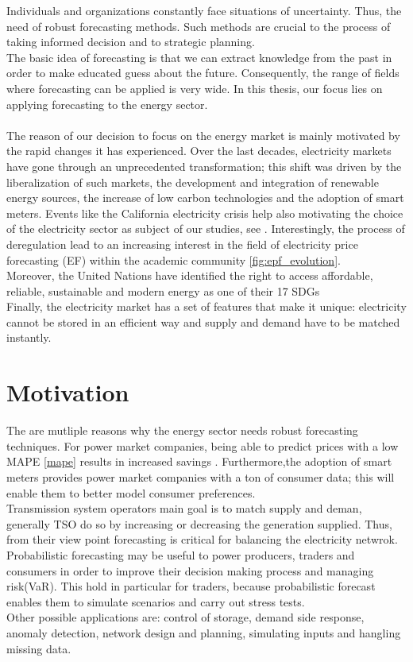 Individuals and organizations constantly face situations of uncertainty. Thus, the need of robust forecasting methods. Such methods are crucial to the process of taking informed decision and to strategic planning.
\\
The basic idea of forecasting is that we can extract knowledge from the past in order to make educated guess about the future. Consequently, the range of fields where forecasting can be applied is very wide.
In this thesis, our focus lies on applying forecasting to the energy sector. 
\\
\\
The reason of our decision to focus on the energy market is mainly motivated by the rapid changes it has experienced.
Over the last decades, electricity markets have gone through an unprecedented transformation; this shift was driven by the liberalization of such markets, the development and integration of renewable energy sources, the  increase of low carbon technologies and the adoption of smart meters. Events like the California electricity crisis help also motivating the choice of the electricity sector as subject of our studies, see \cite{california}.
Interestingly, the process of deregulation lead to an increasing interest in the field of electricity price forecasting (EF) within the academic community \ref{fig:epf_evolution}.
\\
Moreover, the United Nations have identified the right to access affordable, reliable, sustainable and modern energy as one of their 17 SDGs \cite{un_sdgs}
\\
Finally, the electricity market has a set of features that make it unique: electricity cannot be stored in an efficient way and supply and demand have to be matched instantly.
\\
\section{Motivation}
The are mutliple reasons why the energy sector needs robust forecasting techniques.
For power market companies, being able to predict prices with a low MAPE \ref{mape} results in increased savings \cite{savings}. Furthermore,the adoption of smart meters provides power market companies with a ton of consumer data; this will enable them to better model consumer preferences.
\\
Transmission system operators main goal is to match supply and deman, generally TSO do so by increasing or decreasing the generation supplied. Thus, from their view point forecasting is critical for balancing the electricity netwrok.
\\
Probabilistic forecasting may be useful to power producers, traders and consumers in order to improve their decision making process and managing risk(VaR). This hold in particular for traders, because probabilistic forecast enables them to simulate scenarios and carry out stress tests.
\\
Other possible applications are: control of storage, demand side response, anomaly detection, network design and planning, simulating inputs and hangling missing data.
\\
